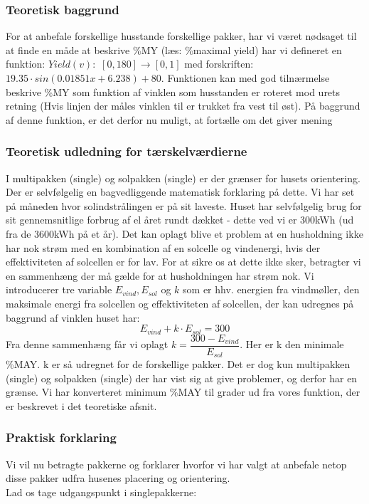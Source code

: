 \documentclass[12pt,a4paper]{article}
\theoremstyle{break}
\theoremstyle{nonumberplain}
\begin{document}
\subsubsection{Teoretisk baggrund}
For at anbefale forskellige husstande forskellige pakker, har vi været nødsaget til at finde en måde at beskrive \%MY (læs: \%maximal yield) har vi defineret en funktion: $Yield(v):$  $[0,180] \rightarrow [0,1]$ med forskriften: $19.35 \cdot sin(0.01851x + 6.238) + 80$. 
Funktionen kan med god tilnærmelse beskrive \%MY som funktion af vinklen som husstanden er roteret mod urets retning (Hvis linjen der måles vinklen til er trukket fra vest til øst). 
På baggrund af denne funktion, er det derfor nu muligt, at fortælle om det giver mening 

\subsubsection{Teoretisk udledning for tærskelværdierne}

I multipakken (single) og solpakken (single) er der grænser for husets orientering. 
Der er selvfølgelig en bagvedliggende matematisk forklaring på dette. 
Vi har set på måneden hvor solindstrålingen er på sit laveste. Huset har selvfølgelig brug for sit gennemsnitlige forbrug af el året rundt dækket - dette ved vi er 300kWh (ud fra de 3600kWh på et år). 
Det kan oplagt blive et problem at en husholdning ikke har nok strøm med en kombination af en solcelle og vindenergi, hvis der effektiviteten af solcellen er for lav. 
For at sikre os at dette ikke sker, betragter vi en sammenhæng der må gælde for at husholdningen har strøm nok. Vi introducerer tre variable $E_{vind},E_{sol}$ og $k$ som er hhv. energien fra vindmøller, den maksimale energi fra solcellen og effektiviteten af solcellen, der kan udregnes på baggrund af vinklen huset har:
$$E_{vind}+k\cdot E_{sol} = 300$$
Fra denne sammenhæng får vi oplagt
$k = \dfrac{300-E_{vind}}{E_{sol}}$. 
Her er k den minimale \%MAY. k er så udregnet for de forskellige pakker. Det er dog kun multipakken (single) og solpakken (single) der har vist sig at give problemer, og derfor har en grænse. Vi har konverteret minimum \%MAY til grader ud fra vores funktion, der er beskrevet i det teoretiske afsnit.

\subsubsection{Praktisk forklaring}
Vi vil nu betragte pakkerne og forklarer hvorfor vi har valgt at anbefale netop disse pakker udfra husenes placering og orientering. 
\\
Lad os tage udgangspunkt i singlepakkerne:
\\
\end{document}
